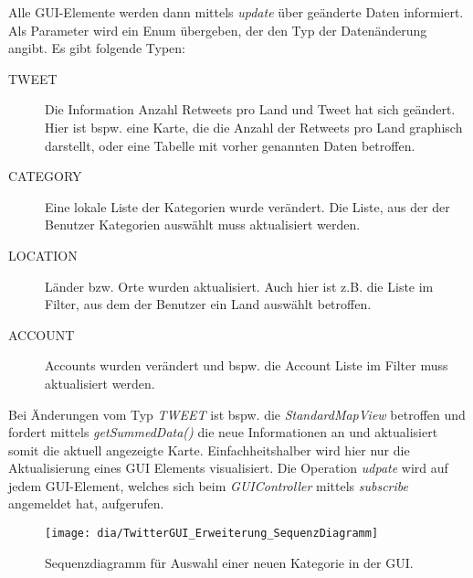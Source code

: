 Alle GUI-Elemente werden dann mittels \emph{update} über geänderte Daten informiert. Als Parameter wird ein Enum übergeben, der den Typ der Datenänderung angibt. Es gibt folgende Typen:
\begin{description}
	\item[TWEET] Die Information Anzahl Retweets pro Land und Tweet hat sich geändert. Hier ist bspw. eine Karte, die die Anzahl der Retweets pro Land graphisch darstellt, oder eine Tabelle mit vorher genannten Daten betroffen. 
	\item[CATEGORY] Eine lokale Liste der Kategorien wurde verändert. Die Liste, aus der der Benutzer Kategorien auswählt muss aktualisiert werden.
	\item[LOCATION] Länder bzw. Orte wurden aktualisiert. Auch hier ist z.B. die Liste im Filter, aus dem der Benutzer ein Land auswählt betroffen.
	\item[ACCOUNT] Accounts wurden verändert und bspw. die Account Liste im Filter muss aktualisiert werden.
\end{description}
Bei Änderungen vom Typ \emph{TWEET} ist bspw. die \emph{StandardMapView} betroffen und fordert mittels \emph{getSummedData()} die neue Informationen an und aktualisiert somit die aktuell angezeigte Karte. Einfachheitshalber wird hier nur die Aktualisierung eines GUI Elements visualisiert. Die Operation \emph{udpate} wird auf jedem GUI-Element, welches sich beim \emph{GUIController} mittels \emph{subscribe} angemeldet hat, aufgerufen.
\begin{figure}[h!]
	\centering
	\texttt{[image: dia/TwitterGUI\_Erweiterung\_SequenzDiagramm]}
	\caption{Sequenzdiagramm für Auswahl einer neuen Kategorie in der GUI.}
	\label{fig:GUISeq}
\end{figure}
